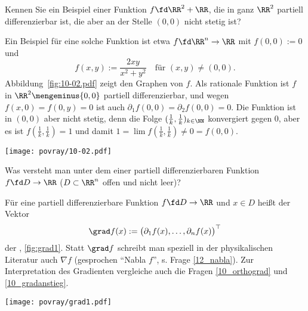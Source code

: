 \begin{frage}
  Kennen Sie ein Beispiel einer Funktion $f\fd \RR^2 + \RR$, die in ganz 
  $\RR^2$ partiell differenzierbar ist, die aber an der Stelle $(0,0)$ nicht 
  stetig ist?
\end{frage}

\begin{antwort}[]%
  Ein Beispiel für eine solche Funktion ist etwa 
  $f \fd \RR^n \to \RR$ mit $f(0,0) := 0$ und 
  \[
  f(x,y) :=  \frac{2xy}{x^2+y^2} 
  \quad \text{für $(x,y)\not=(0,0)$}.
  \]
  Abbildung~\ref{fig:10-02.pdf} zeigt den Graphen von $f$. 
  Als rationale Funktion ist $f$ in $\RR^2 \mengeminus \{0,0\}$ 
  partiell differenzierbar, und wegen $f(x,0)=f(0,y)=0$ ist auch 
  $\partial_1 f(0,0)=\partial_2 f(0,0)=0$. Die Funktion ist in $(0,0)$ aber 
  nicht stetig, denn die Folge $( \frac{1}{k}, \frac{1}{k} )_{k\in\NN}$ 
  konvergiert gegen $0$, aber es ist $f(\frac{1}{k},\frac{1}{k})=1$ und 
  damit $1=\lim f(\frac{1}{k}, \frac{1}{k} ) \not=0 = f(0,0)$.
  \AntEnd

  \begin{center}
    \texttt{[image: povray/10-02.pdf]}
    \label{fig:10-02.pdf}
  \end{center}
\end{antwort}

\begin{frage}
  \label{10_grad_def}
  Was versteht man unter dem  einer 
  partiell differenzierbaren Funktion $f\fd D\to \RR$ 
  ($D\subset \RR^n$ offen und nicht leer)?
\end{frage}  

\begin{antwort}[]%
  \Ant 
  Für eine partiell differenzierbare Funktion $f\fd D\to \RR$ und $x\in D$ 
  heißt der Vektor 
  \[
  \grad f(x) := \big( \partial_1 f(x), \ldots, \partial_n f(x) \big)^\top
  \]
  der , \sieheAbbildung\ref{fig:grad1}. 
  Statt $\grad f$ schreibt man speziell in der physikalischen Literatur 
  auch $\nabla f$ (gesprochen "`Nabla $f$"', s. Frage \ref{12_nabla}). 
  Zur Interpretation des Gradienten vergleiche auch 
  die Fragen \ref{10_orthograd} und 
  \ref{10_gradanstieg}.
  \AntEnd 

  \begin{center}
    \texttt{[image: povray/grad1.pdf]}
    \label{fig:grad1}
  \end{center}
\end{antwort}


